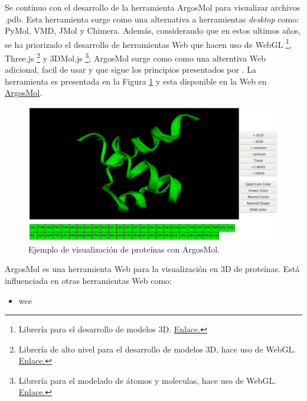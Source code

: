 \documentclass{article}
\begin{document}
Se continuo con el desarrollo de la herramienta ArgosMol para visualizar archivos .pdb. Esta herramienta surge como una alternativa a  herramientas \textit{desktop} como: PyMol, VMD, JMol y Chimera. Además, considerando que en estos ultimos años, se ha priorizado el desarrollo de herramientas Web que hacen uso de WebGL \footnote{Librería para el desarrollo de modelos 3D. \href{https://get.webgl.org/}{Enlace.}}, 		
		Three.js \footnote{Librería de alto nivel para el desarrollo de modelos 3D, hace uso de WebGL. \href{https://threejs.org/}{Enlace.}} y 		
		3DMol.js \footnote{Librería para el modelado de átomos y moleculas, hace uso de WebGL. \href{https://threejs.org/}{Enlace.}}; 
		ArgosMol surge como como una alterntiva Web adicional, facil de usar y que sigue los principios presentados por \cite{youkharibache2017twelve}. La herramienta es presentada en la Figura \ref{fig:argos1} y esta disponible en la Web en \href{http://134.209.44.160/protein-web/3dmol/protein_interaction.php}{ArgosMol}. 
		
		
	\begin{figure}[H]
		\centering
		\includegraphics[width=\textwidth]{img/papers/argos1}
		\caption{ Ejemplo de visualización de proteínas con ArgosMol. }
		\label{fig:argos1}
	\end{figure}

ArgosMol es una herramienta Web para la visualización en 3D de proteínas. Está influenciada en otras herramientas Web como:

\begin{itemize}
	\item wce
\end{itemize}
	
	\clearpage
	
	
	
	
	
	
	
\end{document}
